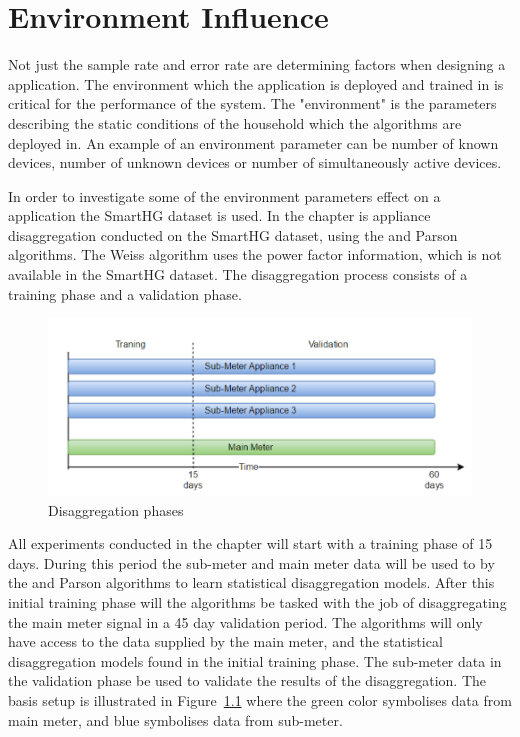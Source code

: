 \chapter{Environment Influence } 
\label{sec:EnvInf}
Not just the sample rate and error rate are determining factors when designing a  application. The environment which the application is deployed and trained in is critical for the performance of the system. The "environment" is the parameters describing the static conditions of the household which the algorithms are deployed in. An example of an environment parameter can be number of known devices, number of unknown devices or number of simultaneously active devices.

In order to investigate some of the environment parameters effect on a  application the SmartHG dataset is used. In the chapter is appliance disaggregation conducted on the SmartHG dataset, using the  and Parson algorithms. The Weiss algorithm uses the power factor information, which is not available in the SmartHG dataset. The disaggregation process consists of a training phase and a validation phase. 

\begin{figure}[H]
\centering
\includegraphics[width=1\textwidth]{billeder/REAL.png}
\caption{Disaggregation phases}
\label{fig:IDF}
\end{figure}

All experiments conducted in the chapter will start with a training phase of 15 days. During this period the sub-meter and main meter data will be used to by the  and Parson algorithms to learn statistical disaggregation models. After this initial training phase will the algorithms be tasked with the job of disaggregating the main meter signal in a 45 day validation period. The algorithms will only have access to the data supplied by the main meter, and the statistical disaggregation models found in the initial training phase. The sub-meter data in the validation phase be used to validate the results of the disaggregation. The basis setup is illustrated in Figure~\ref{fig:IDF} where the green color symbolises data from main meter, and blue symbolises data from sub-meter. 


